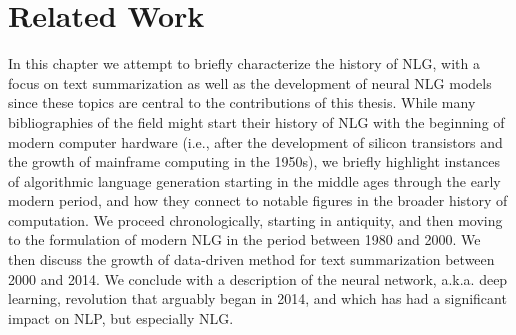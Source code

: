 \chapter{Related Work}
\label{ch:relwork}

\startglyph In this chapter we attempt to briefly characterize the history of
NLG, with a focus on text summarization as well as the development of neural
NLG models since these topics are central to the contributions of this thesis.
While many bibliographies of the field might start their history of NLG with
the beginning of modern computer hardware (i.e., after the development of
silicon transistors and the growth of mainframe computing in the 1950s), we
briefly highlight instances of algorithmic language generation starting in the
middle ages through the early modern period, and how they connect to notable
figures in the broader history of computation.  We proceed chronologically,
starting in antiquity, and then moving to the formulation of modern NLG in the
period between 1980 and 2000. We then discuss the growth of data-driven method
for text summarization between 2000 and 2014.  We conclude with a description
of the neural network, a.k.a. deep learning, revolution that arguably began in
2014, and which has had a significant impact on NLP, but especially NLG. 
